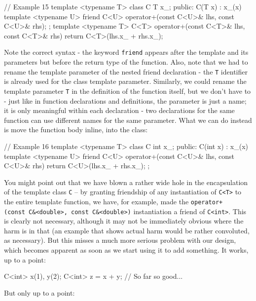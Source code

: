 \begin{code}
// Example 15
template <typename T> class C {
  T x_;
  public:
  C(T x) : x_(x) {}
  template <typename U>
  friend C<U> operator+(const C<U>& lhs, const C<U>& rhs);
};
template <typename T>
C<T> operator+(const C<T>& lhs, const C<T>& rhs) {
  return C<T>(lhs.x_ + rhs.x_);
}
\end{code}

Note the correct syntax - the keyword \texttt{friend} appears after the template and its parameters but before the return type of the function. Also, note that we had to rename the template parameter of the nested friend declaration - the \texttt{T} identifier is already used for the class template parameter. Similarly, we could rename the template parameter \texttt{T} in the definition of the function itself, but we don't have to - just like in function declarations and definitions, the parameter is just a name; it is only meaningful within each declaration - two declarations for the same function can use different names for the same parameter. What we can do instead is move the function body inline, into the class:

\begin{code}
// Example 16
template <typename T> class C {
  int x_;
  public:
  C(int x) : x_(x) {}
  template <typename U>
  friend C<U> operator+(const C<U>& lhs, const C<U>& rhs) {
    return C<U>(lhs.x_ + rhs.x_);
  }
};
\end{code}

You might point out that we have blown a rather wide hole in the encapsulation of the template class \texttt{C} -- by granting friendship of any instantiation of \texttt{C\textless{}T\textgreater{}} to the entire template function, we have, for example, made the \texttt{operator+(const\ C\&\textless{}double\textgreater{},\ const\ C\&\textless{}double\textgreater{})} instantiation a friend of \texttt{C\textless{}int\textgreater{}}. This is clearly not necessary, although it may not be immediately obvious where the harm is in that (an example that shows actual harm would be rather convoluted, as necessary). But this misses a much more serious problem with our design, which becomes apparent as soon as we start using it to add something. It works, up to a point:

\begin{code}
C<int> x(1), y(2);
C<int> z = x + y; // So far so good...
\end{code}

But only up to a point:

